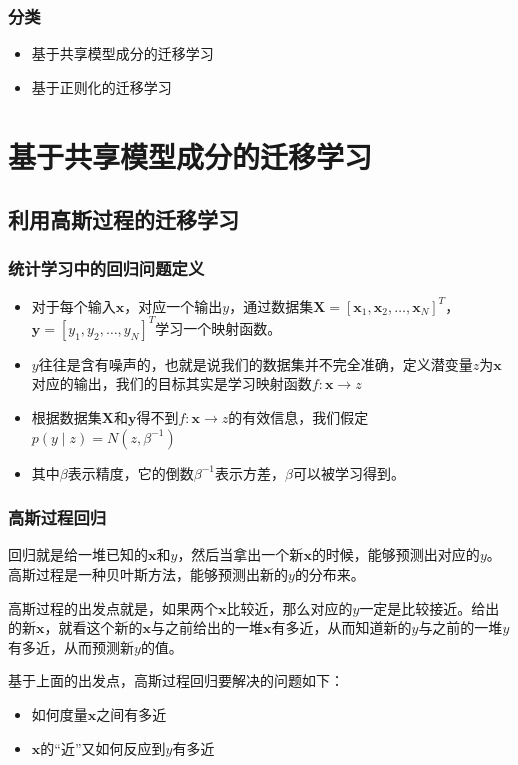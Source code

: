 \documentclass[aspectratio=169]{beamer}
\begin{document}
\begin{frame}
  \frametitle{分类}

  \begin{itemize}
    \item 基于共享模型成分的迁移学习
    \item 基于正则化的迁移学习
  \end{itemize}

\end{frame}

\section{基于共享模型成分的迁移学习}
\subsection{利用高斯过程的迁移学习}

\begin{frame}
  \frametitle{统计学习中的回归问题定义}
  \begin{itemize}
    \item 对于每个输入$\mathbf{x}$，对应一个输出$y$，通过数据集$\mathbf{X}=\left[\mathbf{x}_{1}, \mathbf{x}_{2}, \ldots, \mathbf{x}_{N}\right]^{T}$，$\mathbf{y}=\left[y_{1}, y_{2}, \ldots, y_{N}\right]^{T}$学习一个映射函数。
    \item $y$往往是含有噪声的，也就是说我们的数据集并不完全准确，定义潜变量$z$为$\mathbf{x}$对应的输出，我们的目标其实是学习映射函数$f:\mathbf{x} \rightarrow z$
    \item 根据数据集$\mathbf{X}$和$\mathbf{y}$得不到$f:\mathbf{x} \rightarrow z$的有效信息，我们假定$p(y\mid z) = N(z,\beta ^{-1})$
    \item 其中$\beta$表示精度，它的倒数$\beta ^{-1}$表示方差，$\beta$可以被学习得到。
  \end{itemize}
\end{frame}

\begin{frame}
  \frametitle{高斯过程回归}
  回归就是给一堆已知的$\mathbf{x}$和$y$，然后当拿出一个新$\mathbf{x}$的时候，能够预测出对应的$y$。高斯过程是一种贝叶斯方法，能够预测出新的$y$的分布来。

  高斯过程的出发点就是，如果两个$\mathbf{x}$比较近，那么对应的$y$一定是比较接近。给出的新$\mathbf{x}$，就看这个新的$\mathbf{x}$与之前给出的一堆$\mathbf{x}$有多近，从而知道新的$y$与之前的一堆$y$有多近，从而预测新$y$的值。
  
  基于上面的出发点，高斯过程回归要解决的问题如下：
  \begin{itemize}
    \item 如何度量$\mathbf{x}$之间有多近
    \item $\mathbf{x}$的“近”又如何反应到$y$有多近
  \end{itemize}
\end{frame}
\end{document}
